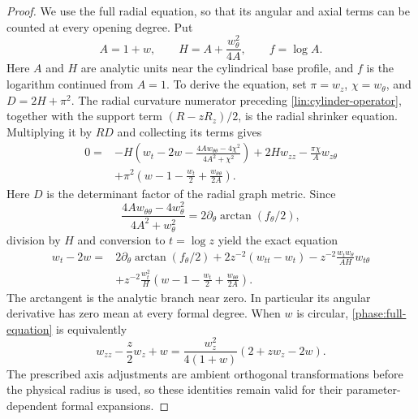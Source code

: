 \begin{proof}
We use the full radial equation, so that its angular and axial terms can
be counted at every opening degree.  Put
\[
 A=1+w,\qquad H=A+\frac{w_\theta^2}{4A},\qquad f=\log A.
\]
Here $A$ and $H$ are analytic units near the cylindrical base profile,
and $f$ is the logarithm continued from $A=1$.  To derive the equation, set
$\pi=w_z$, $\chi=w_\theta$, and $D=2H+\pi^2$.  The radial curvature numerator
preceding \eqref{lin:cylinder-operator}, together with the support term
$(R-zR_z)/2$, is the radial shrinker equation.  Multiplying it by $RD$
and collecting its terms gives
\[
 \begin{aligned}
 0={}&-H\left(w_t-2w-\frac{4A w_{\theta\theta}-4\chi^2}{4A^2+\chi^2}\right)
       +2H w_{zz}-\frac{\pi\chi}{A}w_{z\theta}\\
 &+\pi^2\left(w-1-\frac{w_t}{2}+\frac{w_{\theta\theta}}{2A}\right).
 \end{aligned}
\]
Here $D$ is the determinant factor of the radial graph metric.  Since
\begin{equation}
 \frac{4A w_{\theta\theta}-4w_\theta^2}{4A^2+w_\theta^2}
       =2\partial_\theta\arctan(f_\theta/2),
 \label{phase:angular-divergence}
\end{equation}
division by $H$ and conversion to $t=\log z$ yield the exact equation
\begin{equation}
 \begin{split}
 w_t-2w={}&2\partial_\theta\arctan(f_\theta/2)
       +2z^{-2}(w_{tt}-w_t)
       -z^{-2}\frac{w_t w_\theta}{AH}w_{t\theta}\\
 &+z^{-2}\frac{w_t^2}{H}
       \left(w-1-\frac{w_t}{2}+\frac{w_{\theta\theta}}{2A}\right).
 \end{split}
 \label{phase:full-equation}
\end{equation}
The arctangent is the analytic branch near zero.  In particular its
angular derivative has zero mean at every formal degree.  When $w$ is
circular, \eqref{phase:full-equation} is equivalently
\begin{equation}
 w_{zz}-\frac z2w_z+w
       =\frac{w_z^2}{4(1+w)}(2+zw_z-2w).
 \label{phase:circular}
\end{equation}
The prescribed axis adjustments are ambient orthogonal transformations
before the physical radius is used, so these identities remain valid for
their parameter-dependent formal expansions.


\end{proof}
